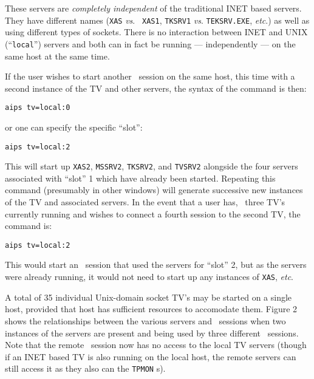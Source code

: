 These servers are {\it completely independent\/} of the traditional INET
based servers.  They have different names ({\tt XAS} {\it vs\/}. {\tt
XAS1}, {\tt TKSRV1} {\it vs\/}. {\tt TEKSRV.EXE}, {\it etc\/}.) as well
as using different types of sockets.  There is no interaction between
INET and UNIX (``{\tt local}'') servers and both can in fact be running
--- independently --- on the same host at the same time.

If the user wishes to start another \ttaips\ session on the same host,
this time with a second instance of the TV and other servers, the syntax
of the command is then:

\begin{trivlist}
\item \hskip 2cm {\tt aips tv=local:0}
\end{trivlist}
or one can specify the specific ``slot'':
\begin{trivlist}
\item \hskip 2cm {\tt aips tv=local:2}
\end{trivlist}

\noindent This will start up {\tt XAS2}, {\tt MSSRV2}, {\tt TKSRV2}, and
{\tt TVSRV2} alongside the four servers associated with ``slot'' 1 which
have already been started.  Repeating this command (presumably in other
windows) will generate successive new instances of the TV and associated
servers.  In the event that a user has, \eg\  three TV's currently
running and wishes to connect a fourth session to the second TV, the
command is:

\begin{trivlist}
\item \hskip 2cm {\tt aips tv=local:2}
\end{trivlist}

\noindent This would start an \ttaips\ session that used the servers for
``slot'' 2, but as the servers were already running, it would not
need to start up any instances of {\tt XAS}, {\it etc\/}.

A total of 35 individual Unix-domain socket TV's may be started on a
single host, provided that host has sufficient resources to accomodate
them.  Figure 2 shows the relationships between the various servers and
\ttaips\ sessions when two instances of the servers are present and
being used by three different \ttaips\ sessions.  Note that the remote
\ttaips\ session now has no access to the local TV servers (though if an
INET based TV is also running on the local host, the remote servers can
still access it as they also can the {\tt TPMON} \daemon s).

